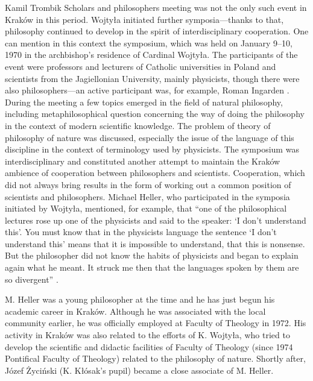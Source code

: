 \begin{artengenv}{Kamil Trombik}
Scholars and philosophers meeting was not the only such event in Kraków in this period. Wojtyła initiated further
symposia---thanks to that, philosophy continued to develop in the spirit of interdisciplinary cooperation. One can
mention in this context the symposium, which was held on January 9--10, 1970 in the archbishop's residence of Cardinal
Wojtyła. The participants of the event were professors and lecturers of Catholic universities in Poland and scientists
from the Jagiellonian University, mainly physicists, though there were also philosophers---an active participant was, for
example, Roman Ingarden
\parencite{heller_poczatki_2006}.
During the meeting a few topics emerged in
the field of natural philosophy, including metaphilosophical question concerning the way of doing the philosophy in the
context of modern scientific knowledge. The problem of theory of philosophy of nature was discussed, especially the
issue of the language of this discipline in the context of terminology used by physicists. The symposium was
interdisciplinary and constituted another attempt to maintain the Kraków ambience of cooperation between philosophers
and scientists. Cooperation, which did not always bring results in the form of working out a common position of
scientists and philosophers. Michael Heller, who participated in the symposia initiated by Wojtyła, mentioned, for
example, that ``one of the philosophical lectures rose up one of the physicists and said to the speaker: `I don't
understand this'. You must know that in the physicists language the sentence `I don't understand this' means that it is
impossible to understand, that this is nonsense. But the philosopher did not know the habits of physicists and began to
explain again what he meant. It struck me then that the languages spoken by them are so
divergent''
\parencite[pp.227--228]{heller_wierze_2016}.

M. Heller was a young philosopher at the time and he has just begun his academic career in Kraków. Although he was
associated with the local community earlier, he was officially employed at Faculty of Theology in 1972. His activity in
Kraków was also related to the efforts of K. Wojtyła, who tried to develop the scientific and didactic facilities of
Faculty of Theology (since 1974 Pontifical Faculty of Theology) related to the philosophy of nature. Shortly after,
Józef Życiński (K. Kłósak's pupil) became a close associate of M. Heller.


\end{artengenv}
